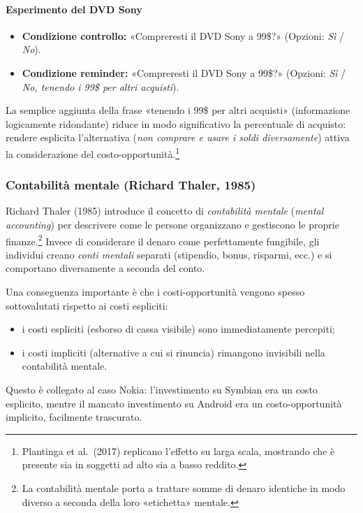 \documentclass[a4paper,12pt]{article}
\begin{document}
	\paragraph{Esperimento del DVD Sony}
	
	\begin{itemize}
		\item \textbf{Condizione controllo:} «Compreresti il DVD Sony a 99\$?» (Opzioni: \emph{Sì} / \emph{No}).
		\item \textbf{Condizione reminder:} «Compreresti il DVD Sony a 99\$?» (Opzioni: \emph{Sì} / \emph{No, tenendo i 99\$ per altri acquisti}).%
	\end{itemize}
	La semplice aggiunta della frase «tenendo i 99\$ per altri acquisti» (informazione logicamente ridondante) riduce in modo significativo la percentuale di acquisto: rendere esplicita l'alternativa (\emph{non comprare e usare i soldi diversamente}) attiva la considerazione del costo-opportunità.\footnote{Plantinga et al.~(2017) replicano l'effetto su larga scala, mostrando che è presente sia in soggetti ad alto sia a basso reddito. }%
	
	\subsubsection{Contabilità mentale (Richard Thaler, 1985)}
	
	Richard Thaler (1985) introduce il concetto di \emph{contabilità mentale} (\emph{mental accounting}) per descrivere come le persone organizzano e gestiscono le proprie finanze.\footnote{La contabilità mentale porta a trattare somme di denaro identiche in modo diverso a seconda della loro «etichetta» mentale.}%
	Invece di considerare il denaro come perfettamente fungibile, gli individui creano \emph{conti mentali} separati (stipendio, bonus, risparmi, ecc.) e si comportano diversamente a seconda del conto.
	
	Una conseguenza importante è che i costi-opportunità vengono spesso sottovalutati rispetto ai costi espliciti:
	\begin{itemize}
		\item i costi espliciti (esborso di cassa visibile) sono immediatamente percepiti;
		\item i costi impliciti (alternative a cui si rinuncia) rimangono invisibili nella contabilità mentale.%
	\end{itemize}
	Questo è collegato al caso Nokia: l'investimento su Symbian era un costo esplicito, mentre il mancato investimento su Android era un costo-opportunità implicito, facilmente trascurato.
	
\end{document}
